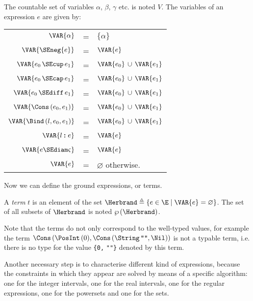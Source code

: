 \begin{Def}\label{variables_in_expressions} 
The countable set of variables $\alpha$, $\beta$, $\gamma$ etc. is
noted $V$. The variables of an expression $e$ are given by:

\begin{center}
\begin{tabular}{rcl}
$\VAR{\alpha}$
              & = & $\{\alpha\}$\\
$\VAR{\SEneg{e}}$
              & = & $\VAR{e}$\\
$\VAR{e_0 \, \SEcup \, e_1}$
              & = & $\VAR{e_0} \, \cup \, \VAR{e_1}$\\
$\VAR{e_0 \, \SEcap \, e_1}$
              & = & $\VAR{e_0} \, \cup \, \VAR{e_1}$\\
$\VAR{e_0 \, \SEdiff \, e_1}$
              & = & $\VAR{e_0} \, \cup \, \VAR{e_1}$\\
$\VAR{\Cons \, (e_0,e_1)}$
              & = & $\VAR{e_0} \, \cup \, \VAR{e_1}$\\
$\VAR{\Bind \, (l,e_0,e_1)}$
              & = & $\VAR{e_0} \, \cup \, \VAR{e_1}$\\
$\VAR{l \pmb{:} e}$
              & = & $\VAR{e}$\\
$\VAR{e \SEdiam \varsigma}$
              & = & $\VAR{e}$\\
$\VAR{e}$      
              & = & $\varnothing$ otherwise.
\end{tabular}
\end{center}
\end{Def}

Now we can define the ground expressions, or terms.

\begin{Def}[Terms]\label{terms} 
A \emph{term} $t$ is an element of the set $\Herbrand \triangleq \{e
\in \E \mid \VAR{e} = \varnothing\}$. The set of all subsets of
$\Herbrand$ is noted $\wp \,(\Herbrand)$.
\end{Def}

Note that the terms do not only correspond to the \ASN well-typed
values, for example the term $\Cons \, (\PosInt \, (0), \Cons \,
(\String \, \texttt{""}, \Nil))$ is not a typable term, i.e. there is
no \ASN type for  the \ASN value \verb+{+\texttt{\small 0,} \verb+""}+
denoted by this term.

Another necessary step is to characterise different kind of
expressions, because the constraints in which they appear are solved
by means of a specific algorithm: one for the integer intervals, one
for the real intervals, one for the regular expressions, one for the
powersets and one for the sets.

